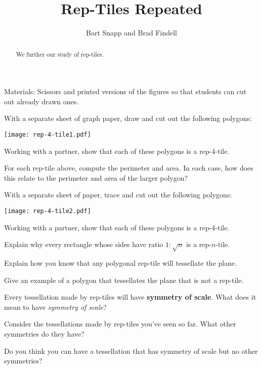 \documentclass[nooutcomes]{ximera}
\title{Rep-Tiles Repeated}
\author{Bart Snapp and Brad Findell}
\begin{document}
\begin{abstract}
  We further our study of rep-tiles.
\end{abstract}
\maketitle


\begin{teachingnote}
Materials:  Scissors and printed versions of the figures so that students can cut out already drawn ones.   
\end{teachingnote}

\begin{problem}
With a separate sheet of graph paper, draw and cut out the following polygons:
\begin{image}
\texttt{[image: rep-4-tile1.pdf]}
\end{image}
Working with a partner, show that each of these polygons is a rep-4-tile.
\end{problem}

\begin{problem}
For each rep-tile above, compute the perimeter and area. In each case,
how does this relate to the perimeter and area of the larger polygon?
\end{problem}


\begin{problem}
With a separate sheet of paper, trace and cut out the following
polygons:
\begin{image}
\texttt{[image: rep-4-tile2.pdf]}
\end{image}
Working with a partner, show that each of these polygons is a rep-4-tile.
\end{problem}


\begin{problem}
Explain why every rectangle whose sides have ratio $1:\sqrt{n}$ is a
rep-$n$-tile.
\end{problem}

\begin{problem}
Explain how you know that any polygonal rep-tile will tessellate the plane.
\end{problem}

\begin{problem}
Give an example of a polygon that tessellates the plane that is not a
rep-tile.
\end{problem}


\begin{problem}
Every tessellation made by rep-tiles will have \textbf{symmetry of scale}. What does it mean to have \textit{symmetry of scale}?
\end{problem}

\begin{problem}
Consider the tessellations made by rep-tiles you've seen so far. What
other symmetries do they have?
\end{problem}

\begin{problem}
Do you think you can have a tessellation that has symmetry of scale
but no other symmetries?
\end{problem}
\end{document}
